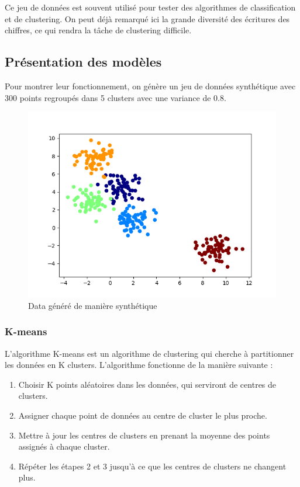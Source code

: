 \documentclass[french,a4paper,18pt]{article}
\begin{document}
Ce jeu de données est souvent utilisé pour tester des algorithmes de classification et de clustering.
On peut déjà remarqué ici la grande diversité des écritures des chiffres, ce qui rendra la tâche de clustering difficile.

\subsection{Présentation des modèles}
Pour montrer leur fonctionnement, on génère un jeu de données synthétique avec 300 points regroupés dans 5 clusters avec une variance de 0.8.
\begin{figure}[h]
    \centering
    \includegraphics[scale=0.5]{images/short_simulation_generate_data.png}
    \caption{Data généré de manière synthétique}\label{fig:short_simulation_data}
\end{figure}

\subsubsection{K-means}

L'algorithme K-means est un algorithme de clustering qui cherche à partitionner les données en K clusters.
L'algorithme fonctionne de la manière suivante :
\begin{enumerate}
    \item Choisir K points aléatoires dans les données, qui serviront de centres de clusters.
    \item Assigner chaque point de données au centre de cluster le plus proche.
    \item Mettre à jour les centres de clusters en prenant la moyenne des points assignés à chaque cluster.
    \item Répéter les étapes 2 et 3 jusqu'à ce que les centres de clusters ne changent plus.
\end{enumerate}
\end{document}

